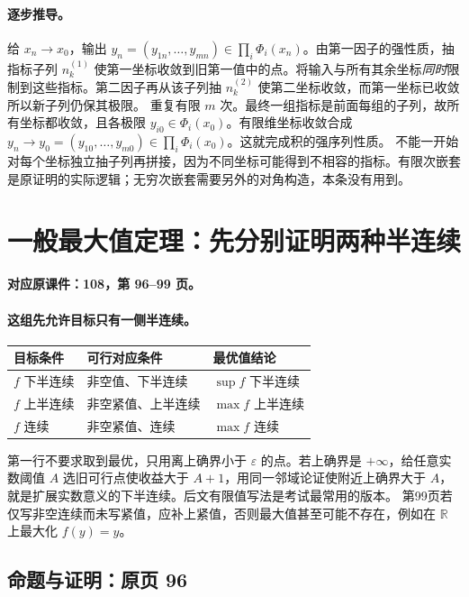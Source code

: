 \documentclass[11pt,a4paper]{article}
\newcommand{\R}{\mathbb{R}}\newcommand{\N}{\mathbb{N}}
\newcommand{\eps}{\varepsilon}
\theoremstyle{definition}\newtheorem{definition}{定义}\newtheorem{example}{例}
\begin{document}
\paragraph{逐步推导。}
给 $x_n\to x_0$，输出 $y_n=(y_{1n},\ldots,y_{mn})\in\prod_i\Phi_i(x_n)$。由第一因子的强性质，抽指标子列 $n^{(1)}_k$ 使第一坐标收敛到旧第一值中的点。将输入与所有其余坐标\emph{同时}限制到这些指标。第二因子再从该子列抽 $n^{(2)}_k$ 使第二坐标收敛，而第一坐标已收敛所以新子列仍保其极限。
重复有限 $m$ 次。最终一组指标是前面每组的子列，故所有坐标都收敛，且各极限 $y_{i0}\in\Phi_i(x_0)$。有限维坐标收敛合成 $y_n\to y_0=(y_{10},\ldots,y_{m0})\in\prod_i\Phi_i(x_0)$。这就完成积的强序列性质。
不能一开始对每个坐标独立抽子列再拼接，因为不同坐标可能得到不相容的指标。有限次嵌套是原证明的实际逻辑；无穷次嵌套需要另外的对角构造，本条没有用到。


\clearpage\section{一般最大值定理：先分别证明两种半连续}\label{g:108:96}

\textbf{对应原课件：108，第 96--99 页。}


\paragraph{这组先允许目标只有一侧半连续。}
\begin{center}\begin{tabular}{p{.25\linewidth}p{.34\linewidth}p{.28\linewidth}}\toprule
目标条件&可行对应条件&最优值结论\\\midrule
$f$ 下半连续&非空值、下半连续&$\sup f$ 下半连续\\
$f$ 上半连续&非空紧值、上半连续&$\max f$ 上半连续\\
$f$ 连续&非空紧值、连续&$\max f$ 连续\\\bottomrule\end{tabular}\end{center}
第一行不要求取到最优，只用离上确界小于 $\eps$ 的点。若上确界是 $+\infty$，给任意实数阈值 $A$ 选旧可行点使收益大于 $A+1$，用同一邻域论证使附近上确界大于 $A$，就是扩展实数意义的下半连续。后文有限值写法是考试最常用的版本。
第99页若仅写非空连续而未写紧值，应补上紧值，否则最大值甚至可能不存在，例如在 $\R$ 上最大化 $f(y)=y$。


\subsection{命题与证明：原页 96}
\end{document}

